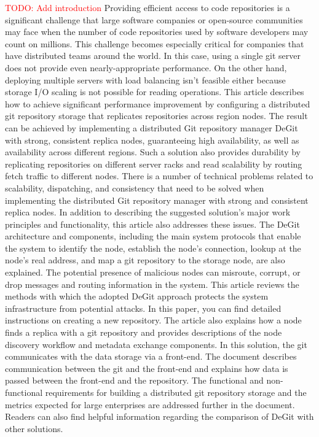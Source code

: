 \documentclass[acmlarge, screen, nonacm]{acmart}
\newcommand{\todo}[1]{\textcolor{red}{TODO: #1}}
\begin{document}
\todo{Add introduction}
Providing efficient access to code repositories is a significant challenge that large software companies or open-source communities may face when the number of code repositories used by software developers may count on millions. This challenge becomes especially critical for companies that have distributed teams around the world.  In this case, using a single git server does not provide even nearly-appropriate performance. On the other hand, deploying multiple servers with load balancing isn’t feasible either because storage I/O scaling is not possible for reading operations. 
This article describes how to achieve significant performance improvement by configuring a distributed git repository storage that replicates repositories across region nodes. The result can be achieved by implementing a distributed Git repository manager DeGit with strong, consistent replica nodes, guaranteeing high availability, as well as availability across diﬀerent regions. Such a solution also provides durability by replicating repositories on diﬀerent server racks and read scalability by routing fetch traﬃc to diﬀerent nodes.
There is a number of technical problems related to scalability, dispatching, and consistency that need to be solved when implementing the distributed Git repository manager with strong and consistent replica nodes. In addition to describing the suggested solution's major work principles and functionality, this article also addresses these issues. The DeGit architecture and components, including the main system protocols that enable the system to identify the node, establish the node's connection, lookup at the node’s real address, and map a git repository to the storage node, are also explained.
The potential presence of malicious nodes can misroute, corrupt, or drop messages and routing information in the system. This article reviews the methods with which the adopted DeGit approach protects the system infrastructure from potential attacks.
In this paper, you can find detailed instructions on creating a new repository. The article also explains how a node finds a replica with a git repository and provides descriptions of the node discovery workflow and metadata exchange components.
In this solution, the git communicates with the data storage via a front-end. The document describes communication between the git and the front-end and explains how data is passed between the front-end and the repository.
The functional and non-functional requirements for building a distributed git repository storage and the metrics expected for large enterprises are addressed further in the document. Readers can also find helpful information regarding the comparison of DeGit with other solutions.
\end{document}
